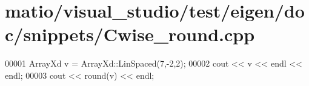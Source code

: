 \hypertarget{matio_2visual__studio_2test_2eigen_2doc_2snippets_2_cwise__round_8cpp_source}{}\section{matio/visual\+\_\+studio/test/eigen/doc/snippets/\+Cwise\+\_\+round.cpp}
\label{matio_2visual__studio_2test_2eigen_2doc_2snippets_2_cwise__round_8cpp_source}

\begin{DoxyCode}
00001 ArrayXd v = ArrayXd::LinSpaced(7,-2,2);
00002 cout << v << endl << endl;
00003 cout << round(v) << endl;
\end{DoxyCode}
